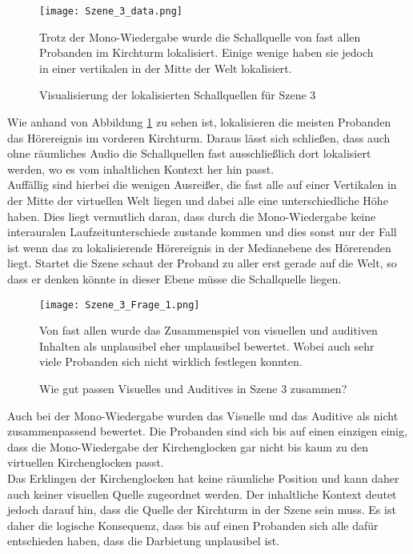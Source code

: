 \begin{figure}[H]
\centering
\texttt{[image: Szene\_3\_data.png]}
\caption{Visualisierung der lokalisierten Schallquellen für Szene 3}
Trotz der Mono-Wiedergabe wurde die Schallquelle von fast allen Probanden im Kirchturm lokalisiert. Einige wenige haben sie jedoch in einer vertikalen in der Mitte der Welt lokalisiert. 

\label{fig:Szene_3_data}
\end{figure} 
\vspace*{30pt}
Wie anhand von Abbildung \ref{fig:Szene_3_data} zu sehen ist, lokalisieren die meisten Probanden das Hörereignis im vorderen Kirchturm. Daraus lässt sich schließen, dass auch ohne räumliches Audio die Schallquellen fast ausschließlich dort lokalisiert werden, wo es vom inhaltlichen Kontext her hin passt.\\

Auffällig sind hierbei die wenigen Ausreißer, die fast alle auf einer Vertikalen in der Mitte der virtuellen Welt liegen und dabei alle eine unterschiedliche Höhe haben. Dies liegt vermutlich daran, dass durch die Mono-Wiedergabe keine interauralen Laufzeitunterschiede zustande kommen und dies sonst nur der Fall ist wenn das zu lokalisierende Hörereignis in der Medianebene des Hörerenden liegt. Startet die Szene schaut der Proband zu aller erst gerade auf die Welt, so dass er denken könnte in dieser Ebene müsse die Schallquelle liegen.

\begin{figure}[H]
\centering
\texttt{[image: Szene\_3\_Frage\_1.png]}
\caption{Wie gut passen Visuelles und Auditives in Szene 3 zusammen?}
Von fast allen wurde das Zusammenspiel von visuellen und auditiven Inhalten als unplausibel eher unplausibel bewertet. Wobei auch sehr viele Probanden sich nicht wirklich festlegen konnten.
\label{fig:Szene_3_Frage1}
\end{figure} 
\vspace*{30pt}
Auch bei der Mono-Wiedergabe wurden das Visuelle und das Auditive als nicht zusammenpassend bewertet. Die Probanden sind sich bis auf einen einzigen einig, dass die Mono-Wiedergabe der Kirchenglocken gar nicht bis kaum zu den virtuellen Kirchenglocken passt.\\

Das Erklingen der Kirchenglocken hat keine räumliche Position und kann daher auch keiner visuellen Quelle zugeordnet werden. Der inhaltliche Kontext deutet jedoch darauf hin, dass die Quelle der Kirchturm in der Szene sein muss. Es ist daher die logische Konsequenz, dass bis auf einen Probanden sich alle dafür entschieden haben, dass die Darbietung unplausibel ist. 

